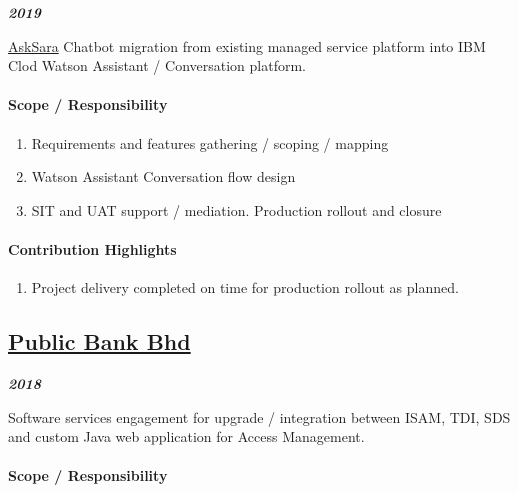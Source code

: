 \documentclass[
]{article}
\providecommand{\tightlist}{%
  \setlength{\itemsep}{0pt}\setlength{\parskip}{0pt}}
\begin{document}
\textbf{\emph{2019}}

\href{https://www.aia.com.my/en/about-aia/media-centre/press-releases/2017/aia-launches-first-insurance-chatbot-in-malaysia.html}{AskSara}
Chatbot migration from existing managed service platform into IBM Clod
Watson Assistant / Conversation platform.

\hypertarget{scope-responsibility-5}{%
\paragraph{Scope / Responsibility}\label{scope-responsibility-5}}

\begin{enumerate}
\def\labelenumi{\arabic{enumi}.}
\tightlist
\item
  Requirements and features gathering / scoping / mapping
\item
  Watson Assistant Conversation flow design
\item
  SIT and UAT support / mediation. Production rollout and closure
\end{enumerate}

\hypertarget{contribution-highlights-5}{%
\paragraph{Contribution Highlights}\label{contribution-highlights-5}}

\begin{enumerate}
\def\labelenumi{\arabic{enumi}.}
\tightlist
\item
  Project delivery completed on time for production rollout as planned.
\end{enumerate}

\hypertarget{public-bank-bhd}{%
\subsection{\texorpdfstring{\href{https://www.pbebank.com/}{Public Bank
Bhd}}{Public Bank Bhd}}\label{public-bank-bhd}}

\textbf{\emph{2018}}

Software services engagement for upgrade / integration between ISAM,
TDI, SDS and custom Java web application for Access Management.

\hypertarget{scope-responsibility-6}{%
\paragraph{Scope / Responsibility}\label{scope-responsibility-6}}
\end{document}
